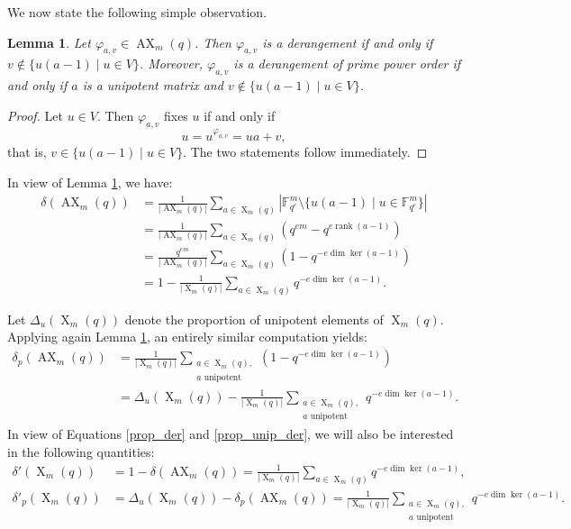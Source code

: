 \documentclass[a4paper, 12pt, oneside]{amsart}
\newtheorem{lemma}[prop]{Lemma}
\theoremstyle{definition}
\DeclareMathOperator{\AX}{AX}
\DeclareMathOperator{\X}{X}
\DeclareMathOperator{\rank}{rank}
\begin{document}
We now state the following simple observation.
\begin{lemma}
\label{equiv}
Let $\varphi_{a,v} \in \AX_m(q)$. Then $\varphi_{a,v}$ is a derangement if and only if $v \notin \{u(a-1) \mid u \in V\}$. Moreover, $\varphi_{a,v}$ is a derangement of prime power order if and only if $a$ is a unipotent matrix and $v \notin \{u(a-1) \mid u \in V\}$.
\end{lemma}
\begin{proof}
Let $u \in V$. Then $\varphi_{a,v}$ fixes $u$ if and only if
$$u=u^{\varphi_{a,v}}=ua+v,$$
that is, $v \in \{u(a-1) \mid u \in V\}$. The two statements follow immediately.
\end{proof}

In view of Lemma \ref{equiv}, we have:
\begin{align}
    \delta(\AX_m(q))&= \frac{1}{|\AX_m(q)|}\sum_{a \in \X_m(q)}|\mathbb{F}^m_{q^e} \setminus\{u(a-1) \mid u \in \mathbb{F}^m_{q^e}\}|\nonumber  \\
    &= \frac{1}{|\AX_m(q)|}\sum_{a \in \X_m(q)}\left(q^{em}-q^{e\rank(a-1)}\right) \nonumber \\
    &= \frac{q^{em}}{|\AX_m(q)|}\sum_{a \in \X_m(q)}\left(1-q^{-e\dim \ker(a-1)}\right) \nonumber \\
    \label{prop_der}
    &=1 - \frac{1}{|\X_m(q)|}\sum_{a\in \X_m(q)}q^{-e\dim \ker(a-1)}.
\end{align}


Let $\Delta_{u}(\X_m(q))$ denote the proportion of unipotent elements of $\X_m(q)$. Applying again Lemma \ref{equiv}, an entirely similar computation yields:
\begin{align}
    \delta_p(\AX_m(q))&=\frac{1}{|\X_m(q)|}\sum_{\substack{a \in \X_m(q),\\ a \text{ unipotent}}}\left(1-q^{-e \dim \ker(a-1)}\right) \nonumber \\
    \label{prop_unip_der}
    &=\Delta_{u}(\X_m(q))-\frac{1}{|\X_m(q)|}\sum_{\substack{a\in \X_m(q),\\a \text{ unipotent}}}q^{-e\dim \ker(a-1)}.
\end{align}
In view of Equations \eqref{prop_der} and \eqref{prop_unip_der}, we will also be interested in the following quantities:
\begin{align} 
\delta'(\X_m(q))&=1-\delta(\AX_m(q))=\frac{1}{|\X_m(q)|}\sum_{a\in \X_m(q)}q^{-e\dim \ker(a-1)}, \label{d'(X_m(q))}\\
\label{d'_p(X_m(q))}
\delta'_p(\X_m(q))&=\Delta_u(\X_m(q))-\delta_p(\AX_m(q))=\frac{1}{|\X_m(q)|}\sum_{\substack{a\in \X_m(q),\\a \text{ unipotent}}}q^{-e\dim \ker(a-1)}.
\end{align}
\end{document}
